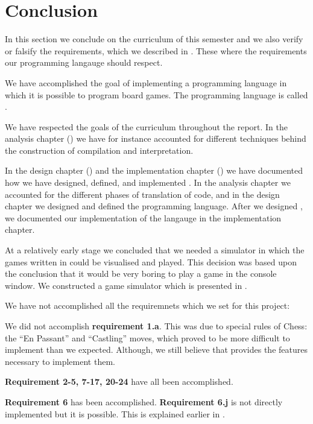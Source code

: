 \chapter{Conclusion}
\label{chap:conclusion}

In this section we conclude on the curriculum of this semester and we also
verify or falsify the requirements, which we described in
. These where the requirements our programming langauge
should respect.

We have accomplished the goal of implementing a programming language in which it
is possible to program board games. The programming language is called
\productname{}.

We have respected the goals of the curriculum throughout the report. In the analysis 
chapter () we have for instance accounted for different 
techniques behind the construction of compilation and interpretation.

In the design chapter () and the implementation chapter
() we have documented how we have designed, defined, and
implemented \productname{}. In the analysis chapter we accounted for the
different phases of translation of code, and in the design chapter we designed
and defined the programming language. After we designed \productname{}, we
documented our implementation of the langauge in the implementation chapter.

At a relatively early stage we concluded that we needed a simulator in which the
games written in \productname{} could be visualised and played. This decision
was based upon the conclusion that it would be very boring to play a game in the
console window. We constructed a game simulator which is presented in 
.

We have not accomplished all the requiremnets which we set for this project:

We did not accomplish \textbf{requirement 1.a}. This was due to special rules of
Chess: the ``En Passant'' and ``Castling'' moves, which proved to be more
difficult to implement than we expected. Although, we still believe that
\productname{} provides the features necessary to implement them.

\textbf{Requirement 2-5, 7-17, 20-24} have all been accomplished.

\textbf{Requirement 6} has been accomplished. \textbf{Requirement 6.j} is not 
directly implemented but it is possible. This is explained earlier in 
.

